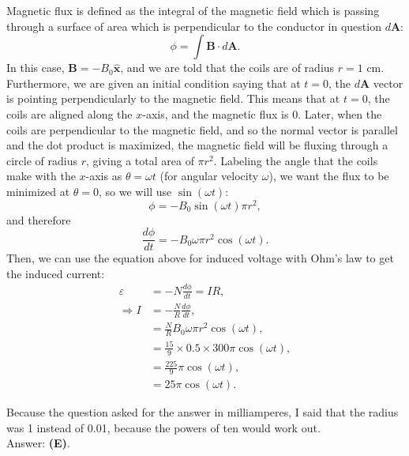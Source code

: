 \documentclass[11pt]{paper}
\newcommand{\answer}[1]{Answer: \textbf{(#1)}.}
\begin{document}
Magnetic flux is defined as the integral of the magnetic field which is passing through a surface of area which is perpendicular to the conductor in question $d\mathbf{A}$:
\begin{equation}
	\phi = \int \mathbf{B}\cdot d\mathbf{A}.
\end{equation}
In this case, $\mathbf{B} = -B_0\mathbf{\hat{x}}$, and we are told that the coils are of radius $r = 1 \text{ cm}$.  Furthermore, we are given an initial condition saying that at $t=0$, the $d\mathbf{A}$ vector is pointing perpendicularly to the magnetic field.  This means that at $t=0$, the coils are aligned along the $x$-axis, and the magnetic flux is 0.  Later, when the coils are perpendicular to the magnetic field, and so the normal vector is parallel and the dot product is maximized, the magnetic field will be fluxing through a circle of radius $r$, giving a total area of $\pi r^2$.  Labeling the angle that the coils make with the $x$-axis as $\theta = \omega t$ (for angular velocity $\omega$), we want the flux to be minimized at $\theta = 0$, so we will use $\sin(\omega t)$:
\begin{equation}
	\phi = -B_0 \sin\left(\omega t\right)\pi r^2,
\end{equation}
and therefore
\begin{equation}
	\frac{d\phi}{dt} = -B_0 \omega \pi r^2 \cos\left(\omega t\right).
\end{equation}
Then, we can use the equation above for induced voltage with Ohm's law to get the induced current:
\begin{align}
	\varepsilon &= -N\frac{d\phi}{dt} = IR,\\
	\Rightarrow I &= -\frac{N}{R}\frac{d\phi}{dt},\\
	&= \frac{N}{R}B_0 \omega \pi r^2 \cos\left(\omega t\right),\\
	&= \frac{15}{9}\times 0.5\times 300 \pi \cos\left(\omega t\right),\\
	&= \frac{225}{9}\pi \cos\left(\omega t\right),\\
	&= 25\pi\cos\left(\omega t\right).
\end{align}

Because the question asked for the answer in milliamperes, I said that the radius was 1 instead of 0.01, because the powers of ten would work out.\\

\answer{E}
\end{document}
